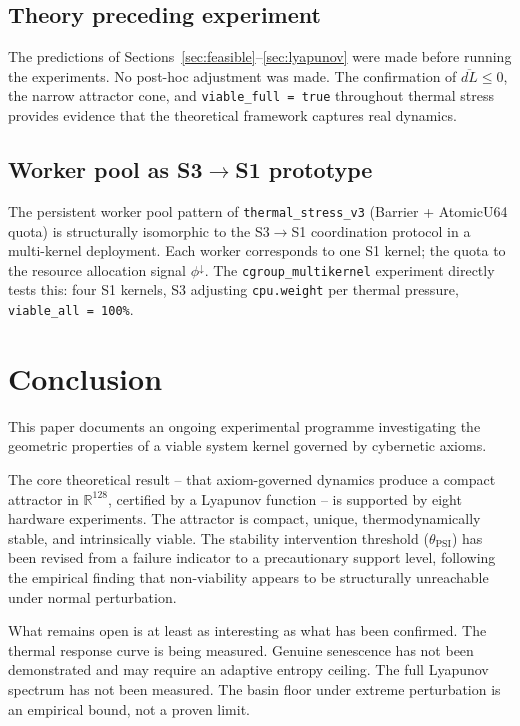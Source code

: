 \documentclass[11pt, a4paper]{article}
\newcommand{\R}{\mathbb{R}}
\begin{document}
\subsection{Theory preceding experiment}

The predictions of Sections~\ref{sec:feasible}--\ref{sec:lyapunov} were
made before running the experiments.
No post-hoc adjustment was made.
The confirmation of $\overline{dL} \le 0$, the narrow attractor cone,
and \texttt{viable\_full = true} throughout thermal stress provides
evidence that the theoretical framework captures real dynamics.

\subsection{Worker pool as S3$\to$S1 prototype}

The persistent worker pool pattern of \texttt{thermal\_stress\_v3}
(Barrier + AtomicU64 quota) is structurally isomorphic to the S3$\to$S1
coordination protocol in a multi-kernel deployment.
Each worker corresponds to one S1 kernel; the quota to the resource
allocation signal $\phi^\downarrow$.
The \texttt{cgroup\_multikernel} experiment directly tests this:
four S1 kernels, S3 adjusting \texttt{cpu.weight} per thermal pressure,
\texttt{viable\_all = 100\%}.


\section{Conclusion}
\label{sec:conclusion}

This paper documents an ongoing experimental programme investigating the
geometric properties of a viable system kernel governed by cybernetic axioms.

The core theoretical result -- that axiom-governed dynamics produce a compact
attractor in $\R^{128}$, certified by a Lyapunov function -- is supported
by eight hardware experiments.
The attractor is compact, unique, thermodynamically stable, and
intrinsically viable.
The stability intervention threshold ($\theta_\text{PSI}$) has been
revised from a failure indicator to a precautionary support level,
following the empirical finding that non-viability appears to be
structurally unreachable under normal perturbation.

What remains open is at least as interesting as what has been confirmed.
The thermal response curve is being measured.
Genuine senescence has not been demonstrated and may require an
adaptive entropy ceiling.
The full Lyapunov spectrum has not been measured.
The basin floor under extreme perturbation is an empirical bound, not
a proven limit.
\end{document}

